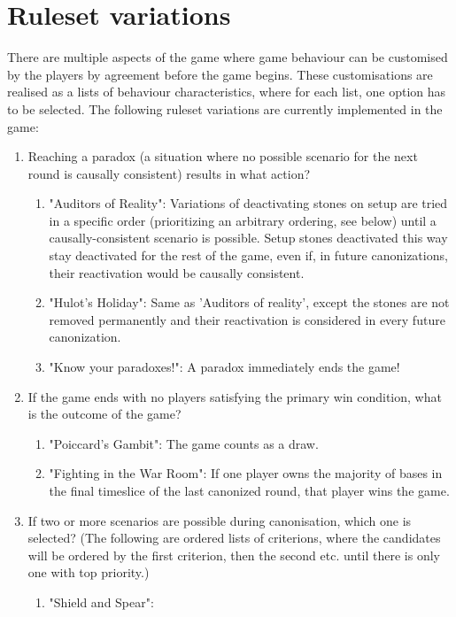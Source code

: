 \documentclass[12pt]{article}
\begin{document}
	\section{Ruleset variations}\label{sec:ruleset variations}
	There are multiple aspects of the game where game behaviour can be customised by the players by agreement before the game begins. These customisations are realised as a lists of behaviour characteristics, where for each list, one option has to be selected. The following ruleset variations are currently implemented in the game:
	\begin{enumerate}
		\item Reaching a paradox (a situation where no possible scenario for the next round is causally consistent) results in what action?
		\begin{enumerate}
			\item "Auditors of Reality": Variations of deactivating stones on setup are tried in a specific order (prioritizing an arbitrary ordering, see below) until a causally-consistent scenario is possible. Setup stones deactivated this way stay deactivated for the rest of the game, even if, in future canonizations, their reactivation would be causally consistent.
			\item "Hulot's Holiday": Same as 'Auditors of reality', except the stones are not removed permanently and their reactivation is considered in every future canonization.
			\item "Know your paradoxes!": A paradox immediately ends the game!
		\end{enumerate}
		\item If the game ends with no players satisfying the primary win condition, what is the outcome of the game?
		\begin{enumerate}
			\item "Poiccard's Gambit": The game counts as a draw.
			\item "Fighting in the War Room": If one player owns the majority of bases in the final timeslice of the last canonized round, that player wins the game.
		\end{enumerate}
		\item If two or more scenarios are possible during canonisation, which one is selected? (The following are ordered lists of criterions, where the candidates will be ordered by the first criterion, then the second etc. until there is only one with top priority.)
		\begin{enumerate}
			\item "Shield and Spear":

\end{enumerate}
\end{enumerate}
\end{document}
